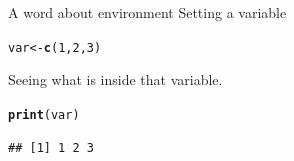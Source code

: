 \documentclass{beamer}\usepackage[]{graphicx}\usepackage[]{color}
\makeatletter
\newcommand{\hlnum}[1]{\textcolor[rgb]{0.686,0.059,0.569}{#1}}%
\newcommand{\hlstd}[1]{\textcolor[rgb]{0.345,0.345,0.345}{#1}}%
\newcommand{\hlkwb}[1]{\textcolor[rgb]{0.69,0.353,0.396}{#1}}%
\newcommand{\hlkwd}[1]{\textcolor[rgb]{0.737,0.353,0.396}{\textbf{#1}}}%
\newenvironment{kframe}{%
 \def\at@end@of@kframe{}%
 \ifinner\ifhmode%
  \def\at@end@of@kframe{\end{minipage}}%
  \begin{minipage}{\columnwidth}%
 \fi\fi%
 \def\FrameCommand##1{\hskip\@totalleftmargin \hskip-\fboxsep
 \colorbox{shadecolor}{##1}\hskip-\fboxsep
     \hskip-\linewidth \hskip-\@totalleftmargin \hskip\columnwidth}%
 \MakeFramed {\advance\hsize-\width
   \@totalleftmargin\z@ \linewidth\hsize
   \@setminipage}}%
 {\par\unskip\endMakeFramed%
 \at@end@of@kframe}
\newenvironment{knitrout}{}{} %
\makeatother
\begin{document}

\begin{frame}[fragile]{A word about environment}
Setting a variable
\begin{knitrout}
\color{fgcolor}\begin{kframe}
\begin{alltt}
\hlstd{var} \hlkwb{<-} \hlkwd{c}\hlstd{(}\hlnum{1}\hlstd{,}\hlnum{2}\hlstd{,}\hlnum{3}\hlstd{)}
\end{alltt}
\end{kframe}
\end{knitrout}
Seeing what is inside that variable.
\begin{knitrout}
\color{fgcolor}\begin{kframe}
\begin{alltt}
\hlkwd{print}\hlstd{(var)}
\end{alltt}
\begin{verbatim}
## [1] 1 2 3
\end{verbatim}
\end{kframe}
\end{knitrout}
\end{frame}
\end{document}
